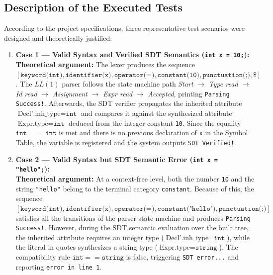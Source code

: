 \documentclass[letterpaper,12pt,oneside]{article}
\begin{document}
\subsection{Description of the Executed Tests}
According to the project specifications, three representative test scenarios were designed and theoretically justified:

\begin{enumerate}
    \item \textbf{Case 1 --- Valid Syntax and Verified SDT Semantics (\texttt{int x = 10;}):} \\
    \textbf{Theoretical argument:} The lexer produces the sequence $[\texttt{keyword(int)}, \texttt{identifier(x)}, \texttt{operator(=)}, \texttt{constant(10)}, \texttt{punctuation(;)}, \$]$. The $LL(1)$ parser follows the state machine path \textit{Start} $\to$ \textit{Type read} $\to$ \textit{Id read} $\to$ \textit{Assignment} $\to$ \textit{Expr read} $\to$ \textit{Accepted}, printing \texttt{Parsing Success!}. Afterwards, the SDT verifier propagates the inherited attribute $\text{Decl'.inh\_type} = \texttt{int}$ and compares it against the synthesized attribute $\text{Expr.type} = \texttt{int}$ deduced from the integer constant \texttt{10}. Since the equality $\texttt{int} == \texttt{int}$ is met and there is no previous declaration of \texttt{x} in the Symbol Table, the variable is registered and the system outputs \texttt{SDT Verified!}.

    \item \textbf{Case 2 --- Valid Syntax but SDT Semantic Error (\texttt{int x = "hello";}):} \\
    \textbf{Theoretical argument:} At a context-free level, both the number \texttt{10} and the string \texttt{"hello"} belong to the terminal category \texttt{constant}. Because of this, the sequence $[\texttt{keyword(int)}, \texttt{identifier(x)}, \texttt{operator(=)}, \texttt{constant("hello")}, \texttt{punctuation(;)}]$ satisfies all the transitions of the parser state machine and produces \texttt{Parsing Success!}. However, during the SDT semantic evaluation over the built tree, the inherited attribute requires an integer type ($\text{Decl'.inh\_type} = \texttt{int}$), while the literal in quotes synthesizes a string type ($\text{Expr.type} = \texttt{string}$). The compatibility rule $\texttt{int} == \texttt{string}$ is false, triggering \texttt{SDT error...} and reporting \texttt{error in line 1}.


\end{enumerate}
\end{document}
